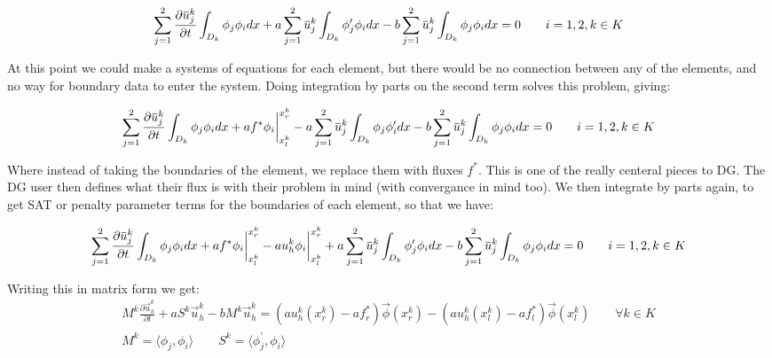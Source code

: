 \documentclass{article}
\newcommand{\overbar}[1]{\mkern 1.5mu\overline{\mkern-1.5mu#1\mkern-1.5mu}\mkern 1.5mu}
\begin{document}
\begin{gather*}
 \sum_{j=1}^2 \frac{\partial\overbar{u}^k_j}{\partial t}\int_{D_k}\phi_j\phi_i dx + a\sum_{j=1}^2 \overbar{u}^k_j\int_{D_k} \phi_j^{\prime} \phi_i dx - b  \sum_{j=1}^2 \overbar{u}^k_j\int_{D_k}\phi_j \phi_i dx = 0 \qquad i = 1,2,  k \in K
\end{gather*}

\noindent At this point we could make a systems of equations for each element, but there would be no connection between any of the elements, and no way for boundary data to enter the system. Doing integration by parts on the second term solves this problem, giving:

\begin{gather*}
  \sum_{j=1}^2 \frac{\partial\overbar{u}^k_j}{\partial t}\int_{D_k}\phi_j\phi_i dx + af^*\phi_i\biggr\rvert_{x_l^k}^{x_r^k}  - a\sum_{j=1}^2 \overbar{u}^k_j\int_{D_k} \phi_j \phi_i^{\prime} dx - b  \sum_{j=1}^2 \overbar{u}^k_j\int_{D_k}\phi_j \phi_i dx = 0 \qquad i = 1,2,  k \in K\\
\end{gather*}

\noindent Where instead of taking the boundaries of the element, we replace them with fluxes $f^*$. This is one of the really centeral pieces to DG. The DG user then defines what their flux is with their problem in mind (with convergance in mind too). We then integrate by parts again, to get SAT or penalty parameter terms for the boundaries of each element, so that we have:

\begin{gather*}
  \sum_{j=1}^2 \frac{\partial\overbar{u}^k_j}{\partial t}\int_{D_k}\phi_j\phi_i dx
  + af^*\phi_i\biggr\rvert_{x_l^k}^{x_r^k} -  au_h^k\phi_i\biggr\rvert_{x_l^k}^{x_r^k} + a\sum_{j=1}^2 \overbar{u}^k_j\int_{D_k} \phi_j^{\prime} \phi_i dx - b  \sum_{j=1}^2 \overbar{u}^k_j\int_{D_k}\phi_j \phi_i dx = 0 \qquad i = 1,2,  k \in K\\
\end{gather*}


\noindent Writing this in matrix form we get:
\begin{gather}
 M^k \frac{\partial\vec{u}_h^k}{\partial t} + a S^k \vec{u}_h^k - bM^k\vec{u}_h^k = (au_h^k(x_r^k) -af^*_r)\vec{\phi}(x_r^k) - (au_h^k(x_l^k) - af^*_l)\vec{\phi}(x_l^k)\qquad \forall k \in K\\
  M^k = \langle \phi_j, \phi_i \rangle \qquad S^k = \langle \phi_j^{\prime}, \phi_i\rangle
\end{gather}
\end{document}
